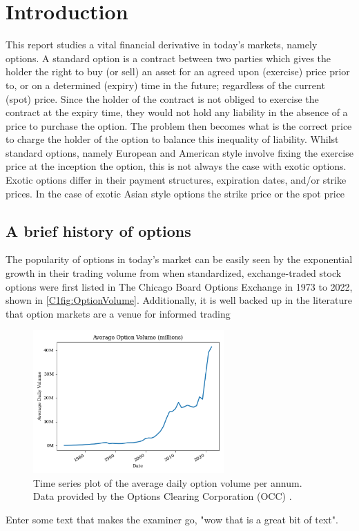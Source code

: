 \chapter{Introduction}

This report studies a vital financial derivative in today's markets, namely options. A standard option is a contract between two parties which gives the holder the right to buy (or sell) an asset for an agreed upon (exercise) price prior to, or on a determined (expiry) time in the future; regardless of the current (spot) price. Since the holder of the contract is not obliged to exercise the contract at the expiry time, they would not hold any liability in the absence of a price to purchase the option. The problem then becomes what is the correct price to charge the holder of the option to balance this inequality of liability. 
\nline
Whilst standard options, namely European and American style involve fixing the exercise price at the inception the option, this is not always the case with exotic options. Exotic options differ in their payment structures, expiration dates, and/or strike prices. In the case of exotic Asian style options the strike price or the spot price  

\section{A brief history of options}

The popularity of options in today's market can be easily seen by the exponential growth in their trading volume from when standardized, exchange-traded stock options were first listed in The Chicago Board Options Exchange in 1973 \cite[p. 52]{markham2002financial} to 2022, shown in \autoref{C1fig:OptionVolume}. Additionally, it is well backed up in the literature that option markets are a venue for informed trading 

\begin{figure}[H]
    \centering
    \includegraphics[width=0.65\textwidth]{Chapters/C1/plots/OptionVolume.png}
    \caption{Time series plot of the average daily option volume per annum. Data provided by the Options Clearing Corporation (OCC) \cite{THEOCC}.}
    \label{C1fig:OptionVolume}
\end{figure}

Enter some text that makes the examiner go, "wow that is a great bit of text". 

